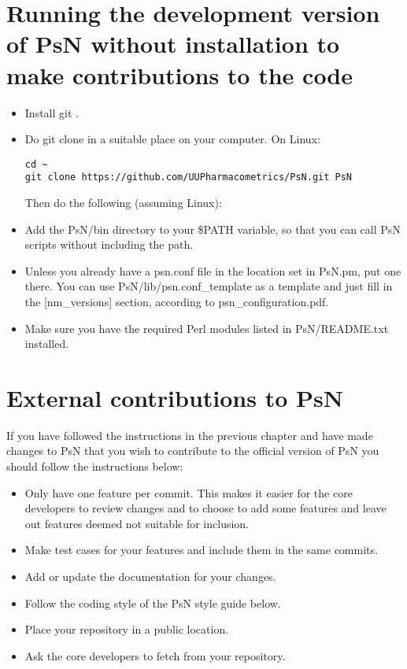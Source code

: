 \section{Running the development version of PsN without installation to make contributions to the code}
\begin{itemize}
\item Install git \cite{git}. 
\item Do git clone in a suitable place on your computer. On Linux:
\begin{verbatim}
cd ~
git clone https://github.com/UUPharmacometrics/PsN.git PsN

\end{verbatim}
\noindent Then do the following (assuming Linux):
\item Add the PsN/bin directory to your \$PATH variable, so that you can call PsN scripts without including the path.
\item Unless you already have a psn.conf file in the location set in PsN.pm, put one there. 
You can use PsN/lib/psn.conf\_template as a template and just fill in the [nm\_versions] section,
according to psn\_configuration.pdf.
\item Make sure you have the required Perl modules listed in PsN/README.txt installed.
\end{itemize}

\section{External contributions to PsN}
If you have followed the instructions in the previous chapter and have made changes to PsN that you wish to contribute
to the official version of PsN you should follow the instructions below:

\begin{itemize}
    \item Only have one feature per commit. This makes it easier for the core developers to review changes and to choose to add some features and leave out features deemed not suitable for inclusion.
    \item Make test cases for your features and include them in the same commits.
    \item Add or update the documentation for your changes.
    \item Follow the coding style of the PsN style guide below.
    \item Place your repository in a public location.
    \item Ask the core developers to fetch from your repository.
\end{itemize}

